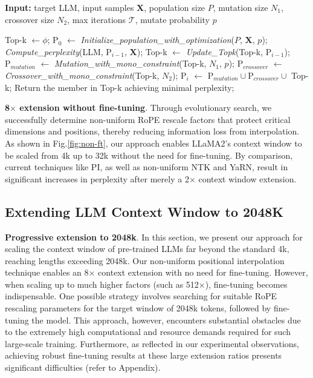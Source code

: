 \begin{algorithm}[t]
	\small
	\caption{The search algorithm}
	\textbf{Input:} target LLM, input samples $\mathbf{X}$,   population size $P$, mutation size $N_1$, crossover size $N_2$, max iterations $\mathcal{T}$, mutate probability $p$\\

	\begin{algorithmic}[1]
		\label{alg:search}
		\STATE Top-k $\leftarrow \phi$;	
		\STATE $\text{P}_0$ $\leftarrow$ \textit{Initialize\_population\_with\_optimization}($P$, $\mathbf{X}$, $p$); 
		\STATE \textit{Compute\_perplexity}(LLM, $\text{P}_{i-1}$, $\mathbf{X}$);
		\STATE Top-k $\leftarrow$ \textit{Update\_Topk}(Top-k, $\text{P}_{i-1}$);
		\STATE $\text{P}_{mutation}$ $\leftarrow$ \textit{Mutation\_with\_mono\_constraint}(Top-k, $N_1$, $p$); 
		\STATE $\text{P}_{crossover}$ $\leftarrow$ \textit{Crossover\_with\_mono\_constraint}(Top-k, $N_2$);
		\STATE $\text{P}_i$ $\leftarrow$ $\text{P}_{mutation} \cup \text{P}_{crossover} \cup$ Top-k;
		\ENDFOR
		\STATE Return the member in Top-k achieving minimal perplexity;
	\end{algorithmic}
\end{algorithm}

\textbf{8$\times$ extension without fine-tuning}. Through evolutionary search, we successfully determine non-uniform RoPE rescale factors that protect critical dimensions and positions, thereby reducing information loss from interpolation. As shown in Fig.\ref{fig:non-ft}, our approach enables LLaMA2’s context window to be scaled from 4k up to 32k without the need for fine-tuning. By comparison, current techniques like PI, as well as non-uniform NTK and YaRN, result in significant increases in perplexity after merely a 2$\times$ context window extension.

\subsection{Extending LLM Context Window to 2048K}
\label{sec:extendto2048k}

\textbf{Progressive extension to 2048k}. In this section, we present our approach for scaling the context window of pre-trained LLMs far beyond the standard 4k, reaching lengths exceeding 2048k. Our non-uniform positional interpolation technique enables an 8$\times$ context extension with no need for fine-tuning. However, when scaling up to much higher factors (such as 512$\times$), fine-tuning becomes indispensable. One possible strategy involves searching for suitable RoPE rescaling parameters for the target window of 2048k tokens, followed by fine-tuning the model. This approach, however, encounters substantial obstacles due to the extremely high computational and resource demands required for such large-scale training. Furthermore, as reflected in our experimental observations, achieving robust fine-tuning results at these large extension ratios presents significant difficulties (refer to Appendix).

